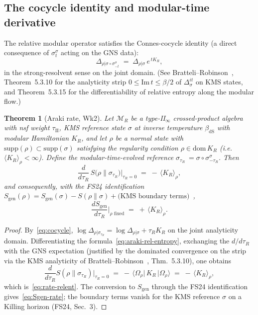 \documentclass[12pt,a4paper]{article}
\newtheorem{theorem}{Theorem}
\theoremstyle{definition}
\begin{document}
\subsection{The cocycle identity and modular-time derivative}
The relative modular operator satisfies the Connes-cocycle identity (a
direct consequence of $\sigma^\sigma_t$ acting on the GNS data):
\begin{equation}
   \Delta_{\rho|\sigma\circ\sigma^\sigma_{-t}}
   \;=\; \Delta_{\rho|\sigma}\,e^{\,t K_R} ,
   \label{eq:cocycle}
\end{equation}
in the strong-resolvent sense on the joint domain. (See
Bratteli--Robinson~\cite{BR2}, Theorem~5.3.10 for the analyticity strip
$0\leq\mathrm{Im}\,t\leq\beta/2$ of $\Delta^{it}_\sigma$ on KMS states,
and Theorem~5.3.15 for the differentiability of relative entropy along
the modular flow.)

\begin{theorem}[Araki rate, Wk2]
\label{thm:araki-rate}
Let $\mathcal{M}_R$ be a type-II$_\infty$ crossed-product algebra with nsf
weight $\tau_{\mathrm{II}}$, KMS reference state $\sigma$ at inverse
temperature $\beta_{\mathrm{dS}}$ with modular Hamiltonian $K_R$, and let
$\rho$ be a normal state with $\mathrm{supp}(\rho)\subset\mathrm{supp}(\sigma)$
satisfying the regularity condition $\rho \in \mathrm{dom}\,K_R$ (i.e.\
$\langle K_R\rangle_\rho<\infty$). Define the modular-time-evolved
reference $\sigma_{\tau_R}\:=\sigma\circ\sigma^\sigma_{-\tau_R}$. Then
\begin{equation}
   \frac{d}{d\tau_R}\,S\bigl(\rho\|\sigma_{\tau_R}\bigr)\bigg|_{\tau_R=0}
   \;=\; -\,\langle K_R\rangle_\rho ,
   \label{eq:rate-relent}
\end{equation}
and consequently, with the FS24 identification
$S_{\mathrm{gen}}(\rho)=S_{\mathrm{gen}}(\sigma)-S(\rho\|\sigma)+
\text{(KMS boundary terms)}$~\cite{FaulknerSperanza2024},
\begin{equation}
   \boxed{\;\;
   \frac{dS_{\mathrm{gen}}}{d\tau_R}\bigg|_{\rho \text{ fixed}}
   \;=\; +\,\langle K_R\rangle_\rho .
   \;\;}
   \label{eq:Sgen-rate}
\end{equation}
\end{theorem}

\begin{proof}
By~\eqref{eq:cocycle},
$\log\Delta_{\rho|\sigma_{\tau_R}}=\log\Delta_{\rho|\sigma}+\tau_R K_R$ on
the joint analyticity domain. Differentiating the
formula~\eqref{eq:araki-rel-entropy}, exchanging the
$d/d\tau_R$ with the GNS expectation (justified by the dominated
convergence on the strip via the KMS analyticity of
Bratteli--Robinson~\cite{BR2}, Thm.~5.3.10), one obtains
\[
   \frac{d}{d\tau_R}S(\rho\|\sigma_{\tau_R})\bigg|_{\tau_R=0}
   \;=\; -\,\langle\Omega_\rho|\,K_R\,|\Omega_\rho\rangle
   \;=\; -\,\langle K_R\rangle_\rho ,
\]
which is~\eqref{eq:rate-relent}. The conversion to $S_{\mathrm{gen}}$
through the FS24 identification gives~\eqref{eq:Sgen-rate}; the
boundary terms vanish for the KMS reference $\sigma$ on a Killing
horizon (FS24, Sec.~3).
\end{proof}
\end{document}
